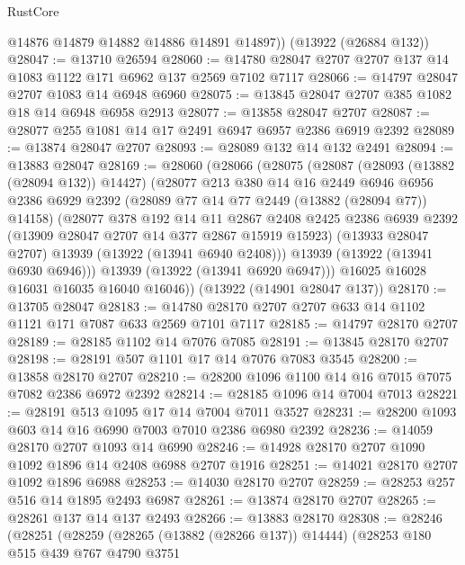 \begin{lexlean}{RustCore}
\begin{coremodule}
        @14876
        @14879
        @14882
        @14886
        @14891
        @14897))
    (@13922 (@26884 @132))
@28047 := @13710 @26594
@28060 := @14780 @28047 @2707 @2707 @137 @14 @1083 @1122 @171 @6962 @137 @2569 @7102 @7117
@28066 := @14797 @28047 @2707 @1083 @14 @6948 @6960
@28075 := @13845 @28047 @2707 @385 @1082 @18 @14 @6948 @6958 @2913
@28077 := @13858 @28047 @2707
@28087 := @28077 @255 @1081 @14 @17 @2491 @6947 @6957 @2386 @6919 @2392
@28089 := @13874 @28047 @2707
@28093 := @28089 @132 @14 @132 @2491
@28094 := @13883 @28047
@28169 := @28060
    (@28066
      (@28075
        (@28087
          (@28093 (@13882 (@28094 @132)) @14427)
          (@28077
            @213
            @380
            @14
            @16
            @2449
            @6946
            @6956
            @2386
            @6929
            @2392
            (@28089 @77 @14 @77 @2449 (@13882 (@28094 @77)) @14158)
            (@28077
              @378
              @192
              @14
              @11
              @2867
              @2408
              @2425
              @2386
              @6939
              @2392
              (@13909 @28047 @2707 @14 @377 @2867 @15919 @15923)
              (@13933 @28047 @2707)
              @13939
              (@13922 (@13941 @6940 @2408)))
            @13939
            (@13922 (@13941 @6930 @6946)))
          @13939
          (@13922 (@13941 @6920 @6947)))
        @16025
        @16028
        @16031
        @16035
        @16040
        @16046))
    (@13922 (@14901 @28047 @137))
@28170 := @13705 @28047
@28183 := @14780 @28170 @2707 @2707 @633 @14 @1102 @1121 @171 @7087 @633 @2569 @7101 @7117
@28185 := @14797 @28170 @2707
@28189 := @28185 @1102 @14 @7076 @7085
@28191 := @13845 @28170 @2707
@28198 := @28191 @507 @1101 @17 @14 @7076 @7083 @3545
@28200 := @13858 @28170 @2707
@28210 := @28200 @1096 @1100 @14 @16 @7015 @7075 @7082 @2386 @6972 @2392
@28214 := @28185 @1096 @14 @7004 @7013
@28221 := @28191 @513 @1095 @17 @14 @7004 @7011 @3527
@28231 := @28200 @1093 @603 @14 @16 @6990 @7003 @7010 @2386 @6980 @2392
@28236 := @14059 @28170 @2707 @1093 @14 @6990
@28246 := @14928 @28170 @2707 @1090 @1092 @1896 @14 @2408 @6988 @2707 @1916
@28251 := @14021 @28170 @2707 @1092 @1896 @6988
@28253 := @14030 @28170 @2707
@28259 := @28253 @257 @516 @14 @1895 @2493 @6987
@28261 := @13874 @28170 @2707
@28265 := @28261 @137 @14 @137 @2493
@28266 := @13883 @28170
@28308 := @28246
    (@28251
      (@28259
        (@28265 (@13882 (@28266 @137)) @14444)
        (@28253
          @180
          @515
          @439
          @767
          @4790
          @3751

\end{coremodule}
\end{lexlean}
